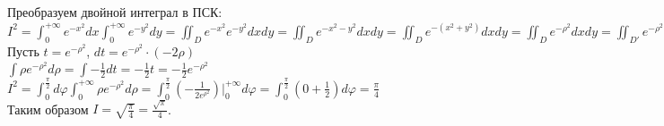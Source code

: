 \begin{enumerate}
        Преобразуем двойной интеграл в ПСК: \\
        $\displaystyle I^2 =
        \int^{+\infty}_0 e^{-x^2} dx \int_0^{+\infty} e^{-y^2} dy =
        \iint_D e^{-x^2} e^{-y^2} dxdy =
        \iint_D e^{-x^2-y^2} dxdy =
        \iint_D e^{-(x^2+y^2)}dxdy =
        \iint_D e^{-\rho^2} dxdy =
        \iint_{D'} e^{-\rho^2} J d\varphi d\rho =
        \iint_{D'} e^{-\rho^2} \rho d\varphi d\rho =
        \int_0^\frac{\pi}{2} d\varphi \int_0^{+\infty} \rho e^{-\rho^2} d\rho$ \\
        Пусть $t = e^{-\rho^2}$, $dt = e^{-\rho^2} \cdot (-2\rho)$ \\
        $\displaystyle \int \rho e^{-\rho^2} d\rho =
        \int -\frac{1}{2} dt = 
        -\frac{1}{2}t = 
        -\frac{1}{2}e^{-\rho^2}$ \\

        $\displaystyle I^2 =
        \int_0^\frac{\pi}{2} d\varphi \int_0^{+\infty} \rho e^{-\rho^2} d\rho = 
        \int_0^\frac{\pi}{2} (-\frac{1}{2e^{\rho^2}})\Big|_0^{+\infty} d\varphi = 
        \int_0^\frac{\pi}{2} (0 + \frac{1}{2}) d\varphi = 
        \frac{\pi}{4}$ \\

        Таким образом $\displaystyle I = \sqrt{\frac{\pi}{4}} = \frac{\sqrt{\pi}}{4}$. \\


\end{enumerate}

